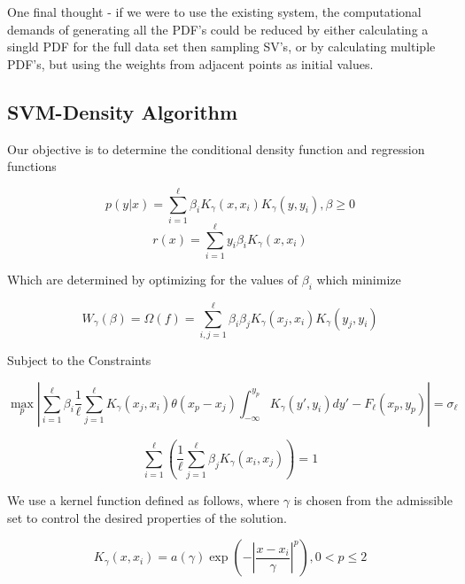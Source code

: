 \documentclass[10pt]{article}
\begin{document}
One final thought - if we were to use the existing system, the computational demands of generating all the PDF's could be reduced by either calculating a singld PDF for the full data set then sampling SV's, or by calculating multiple PDF's, but using the weights from adjacent points as initial values.

\subsection{SVM-Density Algorithm}

Our objective is to determine the conditional density function and regression functions

\begin{equation} p(y|x) = \sum_{i=1}^\ell \beta_i K_\gamma(x,x_i) K_\gamma(y,y_i) , \beta \ge 0 \end{equation}
\begin{equation} r(x) = \sum_{i=1}^\ell y_i \beta_i K_\gamma(x,x_i) \end{equation}

Which are determined by optimizing for the values of \( \beta_i \) which minimize

\begin{equation} W_\gamma(\beta) = \Omega(f) = \sum_{i,j=1}^\ell \beta_i \beta_j K_\gamma(x_j,x_i) K_\gamma(y_j,y_i) \end{equation}

Subject to the Constraints

\begin{equation} \max_p \left | \sum_{i=1}^\ell \beta_i \frac{1}{\ell} \sum_{j=1}^\ell K_\gamma(x_j,x_i)\theta(x_p-x_j) \int_{-\infty}^{y_p} K_\gamma(y',y_i)dy' - F_\ell(x_p,y_p) \right | = \sigma_\ell \end{equation}

\begin{equation} \sum_{i=1}^\ell \left ( \frac{1}{\ell} \sum_{j=1}^\ell \beta_j K_\gamma(x_i,x_j) \right ) = 1 \end{equation}

We use a kernel function defined as follows, where \( \gamma \) is chosen from the admissible set to control the desired properties of the solution.

\begin{equation} K_\gamma(x,x_i) = a(\gamma) \exp \left ( - \left | \frac{x-x_i}{\gamma} \right | ^p \right ) , 0 < p \le 2 \end{equation}
\end{document}
